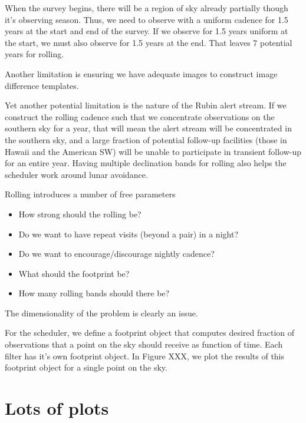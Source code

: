 \documentclass[modern]{aastex62}
\begin{document}
When the survey begins, there will be a region of sky already partially though it's observing season. Thus, we need to observe with a uniform cadence for 1.5 years at the start and end of the survey. If we observe for 1.5 years uniform at the start, we must also observe for 1.5 years at the end. That leaves 7 potential years for rolling. 


Another limitation is ensuring we have adequate images to construct image difference templates. 

Yet another potential limitation is the nature of the Rubin alert stream. If we construct the rolling cadence such that we concentrate observations on the southern sky for a year, that will mean the alert stream will be concentrated in the southern sky, and a large fraction of potential follow-up facilities (those in Hawaii and the American SW) will be unable to participate in transient follow-up for an entire year. Having multiple declination bands for rolling also helps the scheduler work around lunar avoidance.



Rolling introduces a number of free parameters
\begin{itemize}
    \item{How strong should the rolling be?}
    \item{Do we want to have repeat visits (beyond a pair) in a night?}
    \item{Do we want to encourage/discourage nightly cadence?}
    \item{What should the footprint be?}
    \item{How many rolling bands should there be?}
\end{itemize}
The dimensionality of the problem is clearly an issue.


For the scheduler, we define a footprint object that computes desired fraction of observations that a point on the sky should receive as function of time. Each filter has it's own footprint object. In Figure XXX, we plot the results of this footprint object for a single point on the sky.




\section{Lots of plots}
\end{document}
